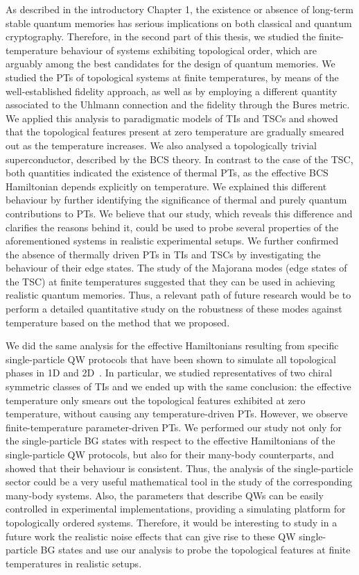 As described in the introductory Chapter 1, the existence or absence of long-term stable quantum memories has serious implications on both classical and quantum cryptography. Therefore, in the second part of this thesis, we studied the finite-temperature behaviour  of systems exhibiting topological order, which are arguably among the best candidates for the design of quantum memories.
We studied the PTs of topological systems at finite temperatures, by means of the well-established fidelity approach, as well as by employing a different quantity associated to the Uhlmann connection and the fidelity through the Bures metric. We applied this analysis to paradigmatic models of TIs and TSCs and showed that the topological features present at zero temperature are gradually smeared out as the temperature increases. We also analysed a topologically trivial superconductor, described by the BCS theory. In contrast to the case of the TSC, both quantities indicated the existence of thermal PTs, as the effective BCS Hamiltonian depends explicitly on temperature. We explained this different behaviour by further identifying the significance of thermal and purely quantum contributions to PTs. We believe that our study, which reveals this difference and clarifies the reasons behind it, could be used to probe several properties of the aforementioned systems in realistic experimental setups. 
We further confirmed the absence of thermally driven PTs in TIs and TSCs by investigating the behaviour of their edge states. The study of the Majorana modes (edge states of the TSC) at finite temperatures suggested that they can be used in achieving realistic quantum memories. Thus, a relevant path of future research would be to perform a detailed quantitative study on the robustness of these modes against temperature based on the method that we proposed. 

We did the same analysis for the effective Hamiltonians resulting from specific single-particle QW protocols that have been shown to simulate all topological phases in 1D and 2D~\cite{kit:rud:ber:dem:10,kit:12}. In particular, we studied representatives of two chiral symmetric classes of TIs and we ended up with the same conclusion: the effective temperature only smears out the topological features exhibited at zero temperature, without causing any temperature-driven PTs. However, we observe finite-temperature parameter-driven PTs. We performed our study not only for the single-particle BG states with respect to the effective Hamiltonians of the single-particle QW protocols, but also for their many-body counterparts, and showed that their behaviour is consistent. Thus, the analysis of the single-particle sector could be a very useful mathematical tool in the study of the corresponding many-body systems. Also, the parameters that describe QWs can be easily controlled in experimental implementations, providing a simulating platform for topologically ordered systems. Therefore, it would be interesting to study in a future work the realistic noise effects that can give rise to these QW single-particle BG states and use our analysis to probe the topological features at finite temperatures in realistic setups. 

